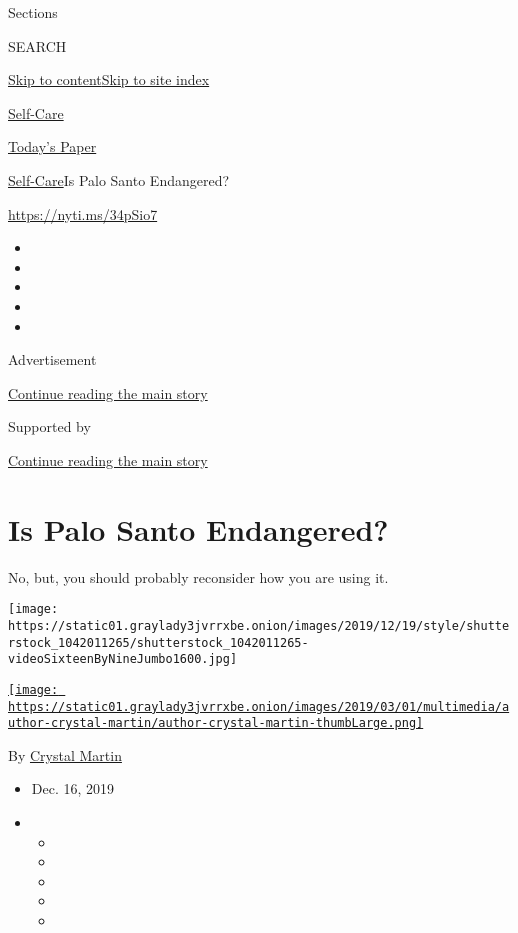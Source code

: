 Sections

SEARCH

\protect\hyperlink{site-content}{Skip to
content}\protect\hyperlink{site-index}{Skip to site index}

\href{https://www.nytimes3xbfgragh.onion/section/style/self-care/}{Self-Care}

\href{https://myaccount.nytimes3xbfgragh.onion/auth/login?response_type=cookie\&client_id=vi}{}

\href{https://www.nytimes3xbfgragh.onion/section/todayspaper}{Today's
Paper}

\href{/section/style/self-care/}{Self-Care}\textbar{}Is Palo Santo
Endangered?

\url{https://nyti.ms/34pSio7}

\begin{itemize}
\item
\item
\item
\item
\item
\end{itemize}

Advertisement

\protect\hyperlink{after-top}{Continue reading the main story}

Supported by

\protect\hyperlink{after-sponsor}{Continue reading the main story}

\hypertarget{is-palo-santo-endangered}{%
\section{Is Palo Santo Endangered?}\label{is-palo-santo-endangered}}

No, but, you should probably reconsider how you are using it.

\texttt{[image: https://static01.graylady3jvrrxbe.onion/images/2019/12/19/style/shutterstock\_1042011265/shutterstock\_1042011265-videoSixteenByNineJumbo1600.jpg]}

\href{https://www.nytimes3xbfgragh.onion/by/crystal-martin}{\texttt{[image: https://static01.graylady3jvrrxbe.onion/images/2019/03/01/multimedia/author-crystal-martin/author-crystal-martin-thumbLarge.png]}}

By \href{https://www.nytimes3xbfgragh.onion/by/crystal-martin}{Crystal
Martin}

\begin{itemize}
\item
  Dec. 16, 2019
\item
  \begin{itemize}
  \item
  \item
  \item
  \item
  \item
  \end{itemize}
\end{itemize}

